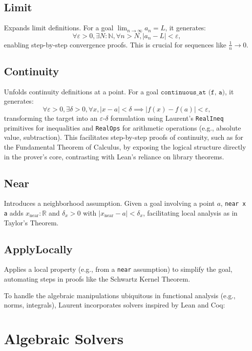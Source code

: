 \documentclass{article}
\begin{document}
\subsection{Limit}
Expands limit definitions. For a goal $\lim_{n \to \infty} a_n = L$, it generates:
\[
\forall \varepsilon > 0, \exists N : \mathbb{N}, \forall n > N, |a_n - L| < \varepsilon,
\]
enabling step-by-step convergence proofs. This is crucial for sequences like $\frac{1}{n} \to 0$.

\subsection{Continuity}
Unfolds continuity definitions at a point. For a goal \( \texttt{continuous\_at (f, a)} \), it generates:
\[
\forall \varepsilon > 0, \exists \delta > 0, \forall x, |x - a| < \delta \implies |f(x) - f(a)| < \varepsilon,
\]
transforming the target into an \(\varepsilon\)-$\delta$ formulation
using Laurent’s \texttt{RealIneq} primitives for inequalities and
\texttt{RealOps} for arithmetic operations (e.g., absolute value,
subtraction). This facilitates step-by-step proofs of continuity,
such as for the Fundamental Theorem of Calculus, by exposing the
logical structure directly in the prover’s core, contrasting with
Lean’s reliance on library theorems.

\subsection{Near}
Introduces a neighborhood assumption. Given a goal involving a
point $a$, \texttt{near x a} adds $x_{\text{near}} : \mathbb{R}$
and $\delta_x > 0$ with $|x_{\text{near}} - a| < \delta_x$,
facilitating local analysis as in Taylor’s Theorem.

\subsection{ApplyLocally}
Applies a local property (e.g., from a \texttt{near} assumption) to
simplify the goal, automating steps in proofs like the Schwartz Kernel Theorem.

To handle the algebraic manipulations ubiquitous in functional analysis (e.g., norms, integrals),
Laurent incorporates solvers inspired by Lean and Coq:


\section{Algebraic Solvers}
\end{document}
